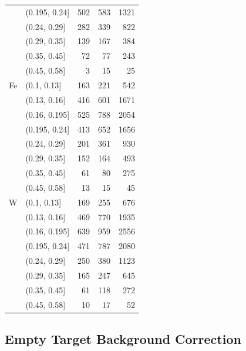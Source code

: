 \begin{table}
\begin{tabular}{llrrr}
	& (0.195, 0.24] &            502 &            583 &           1321 \\
	& (0.24, 0.29] &            282 &            339 &            822 \\
	& (0.29, 0.35] &            139 &            167 &            384 \\
	& (0.35, 0.45] &             72 &             77 &            243 \\
	& (0.45, 0.58] &              3 &             15 &             25 \\
\rowcol 	Fe & (0.1, 0.13] &            163 &            221 &            542 \\
\rowcol 	& (0.13, 0.16] &            416 &            601 &           1671 \\
\rowcol 	& (0.16, 0.195] &            525 &            788 &           2054 \\
\rowcol 	& (0.195, 0.24] &            413 &            652 &           1656 \\
\rowcol 	& (0.24, 0.29] &            201 &            361 &            930 \\
\rowcol 	& (0.29, 0.35] &            152 &            164 &            493 \\
\rowcol 	& (0.35, 0.45] &             61 &             80 &            275 \\
\rowcol 	& (0.45, 0.58] &             13 &             15 &             45 \\
	W & (0.1, 0.13] &            169 &            255 &            676 \\
	& (0.13, 0.16] &            469 &            770 &           1935 \\
	& (0.16, 0.195] &            639 &            959 &           2556 \\
	& (0.195, 0.24] &            471 &            787 &           2080 \\
	& (0.24, 0.29] &            250 &            380 &           1123 \\
	& (0.29, 0.35] &            165 &            247 &            645 \\
	& (0.35, 0.45] &             61 &            118 &            272 \\
	& (0.45, 0.58] &             10 &             17 &             52 \\
	\bottomrule
\end{tabular}
\end{table}

\subsection{ Empty Target Background Correction}

